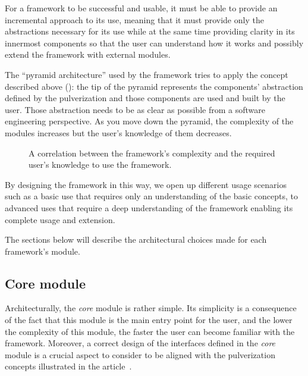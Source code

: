 For a framework to be successful and usable, it must be able to provide an incremental approach to its use,
meaning that it must provide only the abstractions necessary for its use while at the same time providing clarity in its innermost components so that
the user can understand how it works and possibly extend the framework with external modules.

The ``pyramid architecture'' used by the framework tries to apply the concept described above ():
the tip of the pyramid represents the components' abstraction defined by the pulverization and those components are used and built by the user.
Those abstraction needs to be as clear as possible from a software engineering perspective.
As you move down the pyramid, the complexity of the modules increases but the user's knowledge of them decreases.

\begin{figure}
	\centering
	\caption{A correlation between the framework's complexity and the required user's knowledge to use the framework.}
	\label{fig:pyramid-user-knowledge}
\end{figure}

By designing the framework in this way, we open up different usage scenarios such as a basic use that requires only an understanding of the
basic concepts, to advanced uses that require a deep understanding of the framework enabling its complete usage and extension.


The sections below will describe the architectural choices made for each framework's module.

\subsection{Core module}
\label{sec:core-module}

Architecturally, the \emph{core} module is rather simple. Its simplicity is a consequence of the fact that this module is the main entry point
for the user, and the lower the complexity of this module, the faster the user can become familiar with the framework.
Moreover, a correct design of the interfaces defined in the \emph{core} module is a crucial aspect to consider to be aligned with the
pulverization concepts illustrated in the article~\cite{fi12110203}.

